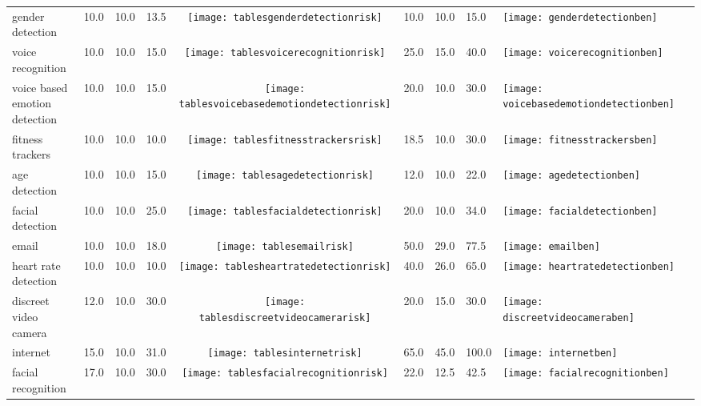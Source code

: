 \begin{table}[t]
\begin{center}
\begin{tabular}{| p{2cm} | p{1cm} | p{1cm} | p{1cm} | c | p{2cm} | p{1cm} | p{1cm} | p{1cm} | c |}
gender detection & 10.0 & 10.0 & 13.5 & \texttt{[image: tablesgenderdetectionrisk]} & 10.0 & 10.0 & 15.0 & \texttt{[image: genderdetectionben]} \\ 
voice recognition & 10.0 & 10.0 & 15.0 & \texttt{[image: tablesvoicerecognitionrisk]} & 25.0 & 15.0 & 40.0 & \texttt{[image: voicerecognitionben]} \\ 
voice based emotion detection & 10.0 & 10.0 & 15.0 & \texttt{[image: tablesvoicebasedemotiondetectionrisk]} & 20.0 & 10.0 & 30.0 & \texttt{[image: voicebasedemotiondetectionben]} \\ 
fitness trackers & 10.0 & 10.0 & 10.0 & \texttt{[image: tablesfitnesstrackersrisk]} & 18.5 & 10.0 & 30.0 & \texttt{[image: fitnesstrackersben]} \\ 
age detection & 10.0 & 10.0 & 15.0 & \texttt{[image: tablesagedetectionrisk]} & 12.0 & 10.0 & 22.0 & \texttt{[image: agedetectionben]} \\ 
facial detection & 10.0 & 10.0 & 25.0 & \texttt{[image: tablesfacialdetectionrisk]} & 20.0 & 10.0 & 34.0 & \texttt{[image: facialdetectionben]} \\ 
email & 10.0 & 10.0 & 18.0 & \texttt{[image: tablesemailrisk]} & 50.0 & 29.0 & 77.5 & \texttt{[image: emailben]} \\ 
heart rate detection & 10.0 & 10.0 & 10.0 & \texttt{[image: tablesheartratedetectionrisk]} & 40.0 & 26.0 & 65.0 & \texttt{[image: heartratedetectionben]} \\ 
discreet video camera & 12.0 & 10.0 & 30.0 & \texttt{[image: tablesdiscreetvideocamerarisk]} & 20.0 & 15.0 & 30.0 & \texttt{[image: discreetvideocameraben]} \\ 
internet & 15.0 & 10.0 & 31.0 & \texttt{[image: tablesinternetrisk]} & 65.0 & 45.0 & 100.0 & \texttt{[image: internetben]} \\ 
facial recognition & 17.0 & 10.0 & 30.0 & \texttt{[image: tablesfacialrecognitionrisk]} & 22.0 & 12.5 & 42.5 & \texttt{[image: facialrecognitionben]} \\ 

\end{tabular}
\end{center}
\end{table}
